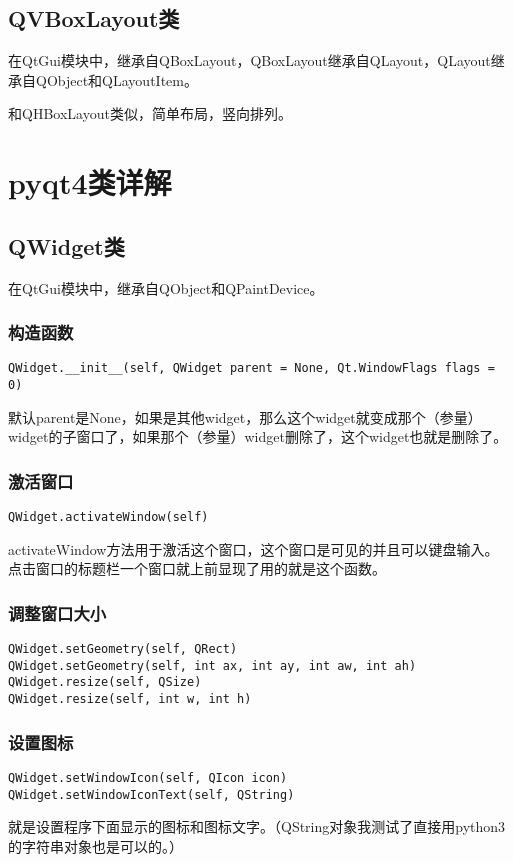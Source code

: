 \documentclass[12pt,oneside]{book}
\begin{document}
\begin{common-format}
\section{QVBoxLayout类}
在QtGui模块中，继承自QBoxLayout，QBoxLayout继承自QLayout，QLayout继承自QObject和QLayoutItem。

和QHBoxLayout类似，简单布局，竖向排列。


\chapter{pyqt4类详解}
\section{QWidget类}
在QtGui模块中，继承自QObject和QPaintDevice。

\subsection{构造函数}
\begin{Verbatim}
QWidget.__init__(self, QWidget parent = None, Qt.WindowFlags flags = 0)
\end{Verbatim}

默认parent是None，如果是其他widget，那么这个widget就变成那个（参量）widget的子窗口了，如果那个（参量）widget删除了，这个widget也就是删除了。

\subsection{激活窗口}
\begin{Verbatim}
QWidget.activateWindow(self)
\end{Verbatim}
activateWindow方法用于激活这个窗口，这个窗口是可见的并且可以键盘输入。点击窗口的标题栏一个窗口就上前显现了用的就是这个函数。

\subsection{调整窗口大小}
\begin{Verbatim}
QWidget.setGeometry(self, QRect)
QWidget.setGeometry(self, int ax, int ay, int aw, int ah)
QWidget.resize(self, QSize)
QWidget.resize(self, int w, int h)
\end{Verbatim}

\subsection{设置图标}
\begin{Verbatim}
QWidget.setWindowIcon(self, QIcon icon)
QWidget.setWindowIconText(self, QString)
\end{Verbatim}
就是设置程序下面显示的图标和图标文字。（QString对象我测试了直接用python3的字符串对象也是可以的。）



\end{common-format}
\end{document}
